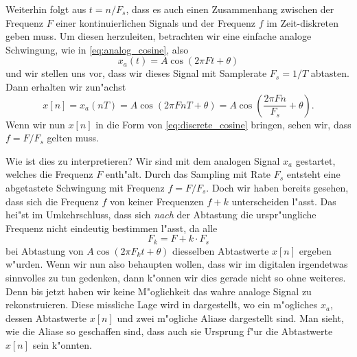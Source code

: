Weiterhin folgt aus $t = n/F_s$, dass es auch einen Zusammenhang zwischen der Frequenz $F$ einer kontinuierlichen Signals und der Frequenz $f$ im Zeit-diskreten geben muss.
Um diesen herzuleiten, betrachten wir eine einfache analoge Schwingung, wie in \eqref{eq:analog_cosine}, also
\[
x_a(t) = A \cos(2 \pi F t + \theta)
\]
und wir stellen uns vor, dass wir dieses Signal mit Samplerate $F_s = 1/T$ abtasten. Dann erhalten wir zun"achst
\[
x[n] 
    = x_a(n T) 
    = A \cos(2 \pi F n T + \theta) 
    = A \cos\left(\frac{2 \pi F n}{F_s} + \theta\right).
\]
Wenn wir nun $x[n]$ in die Form von \eqref{eq:discrete_cosine} bringen, sehen wir, dass $f = F/F_s$ gelten muss.

Wie ist dies zu interpretieren? 
Wir sind mit dem analogen Signal $x_a$ gestartet, welches die Frequenz $F$ enth"alt.
Durch das Sampling mit Rate $F_s$ entsteht eine abgetastete Schwingung mit Frequenz $f = F/F_s$. 
Doch wir haben bereits gesehen, dass sich die Frequenz $f$ von keiner Frequenzen $f + k$ unterscheiden l"asst.
Das hei"st im Umkehrschluss, dass sich \emph{nach} der Abtastung die urspr"ungliche Frequenz nicht eindeutig bestimmen l"asst, da alle
\[
F_k = F + k \cdot F_s 
\]
bei Abtastung von $A \cos(2 \pi F_k t + \theta)$ diesselben Abtastwerte $x[n]$ ergeben w"urden.
Wenn wir nun also behaupten wollen, dass wir im digitalen irgendetwas sinnvolles zu tun gedenken, dann k"onnen wir dies gerade nicht so ohne weiteres.
Denn bis jetzt haben wir keine M"oglichkeit das wahre analoge Signal zu rekonstruieren.
Diese missliche Lage wird in  dargestellt, wo ein m"ogliches
$x_a$, dessen Abtastwerte $x[n]$ und zwei m"ogliche Aliase dargestellt sind.
Man sieht, wie die Aliase so geschaffen sind, dass auch sie Ursprung f"ur die Abtastwerte $x[n]$ sein k"onnten.
%
